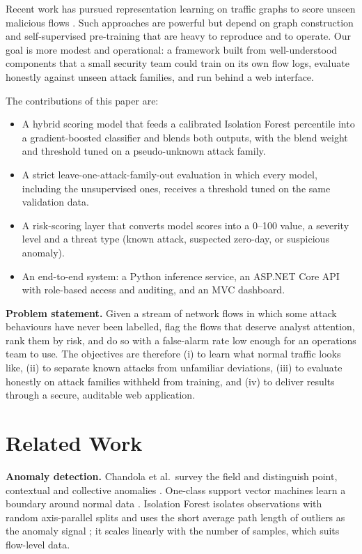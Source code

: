 \documentclass[conference]{IEEEtran}
\begin{document}
Recent work has pursued representation learning on traffic graphs to score unseen malicious flows \cite{basepaper2026}. Such approaches are powerful but depend on graph construction and self-supervised pre-training that are heavy to reproduce and to operate. Our goal is more modest and operational: a framework built from well-understood components that a small security team could train on its own flow logs, evaluate honestly against unseen attack families, and run behind a web interface.

The contributions of this paper are:
\begin{itemize}
\item A hybrid scoring model that feeds a calibrated Isolation Forest percentile into a gradient-boosted classifier and blends both outputs, with the blend weight and threshold tuned on a pseudo-unknown attack family.
\item A strict leave-one-attack-family-out evaluation in which every model, including the unsupervised ones, receives a threshold tuned on the same validation data.
\item A risk-scoring layer that converts model scores into a 0--100 value, a severity level and a threat type (known attack, suspected zero-day, or suspicious anomaly).
\item An end-to-end system: a Python inference service, an ASP.NET Core API with role-based access and auditing, and an MVC dashboard.
\end{itemize}

\textbf{Problem statement.} Given a stream of network flows in which some attack behaviours have never been labelled, flag the flows that deserve analyst attention, rank them by risk, and do so with a false-alarm rate low enough for an operations team to use. The objectives are therefore (i) to learn what normal traffic looks like, (ii) to separate known attacks from unfamiliar deviations, (iii) to evaluate honestly on attack families withheld from training, and (iv) to deliver results through a secure, auditable web application.

\section{Related Work}
\textbf{Anomaly detection.} Chandola et al.\ survey the field and distinguish point, contextual and collective anomalies \cite{chandola2009anomaly}. One-class support vector machines learn a boundary around normal data \cite{scholkopf2001estimating}. Isolation Forest isolates observations with random axis-parallel splits and uses the short average path length of outliers as the anomaly signal \cite{liu2008isolation}; it scales linearly with the number of samples, which suits flow-level data.
\end{document}

